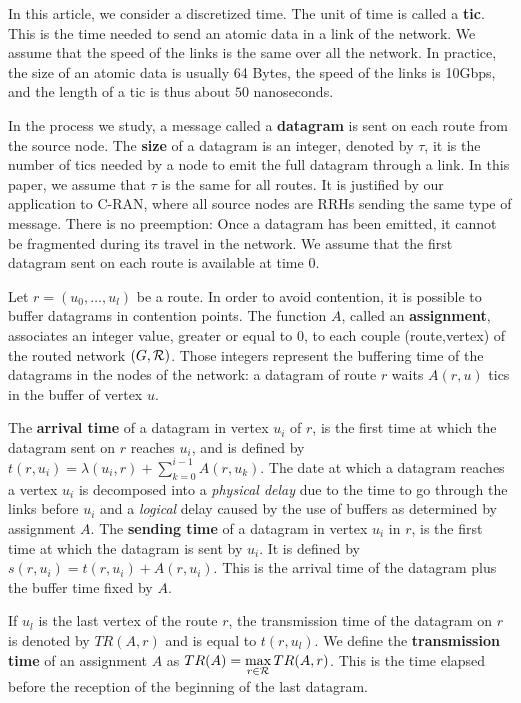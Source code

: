 \documentclass[english]{article}
\begin{document}
 		In this article, we consider a discretized time. The unit of time is called a {\bf tic}. This is the time needed to send an atomic data in a link of the network. We assume that the speed of the links is the same over all the network. In practice, the size of an atomic data is usually 64 Bytes, the speed of the links is 10Gbps, and the length of a tic is thus about $50$ nanoseconds.

        In the process we study, a message called a {\bf datagram} is sent on each route from the source node. The \textbf{size} of a datagram is an integer, denoted by $\tau$, it is the number of tics needed by a node to emit the full datagram through a link.  In this paper, we assume that $\tau$ is the same for all routes. It is justified by our application to C-RAN, where all source nodes are RRHs sending the same type of message. There is no preemption: Once a datagram has been emitted, it cannot be fragmented during its travel in the network. We assume that the first datagram sent on each route is available at time $0$.

          Let $r=(u_0,\dots,u_l)$ be a route. In order to avoid contention, it is possible to buffer datagrams in contention points. The function $A$, called an \textbf{assignment}, associates an integer value, greater or equal to $0$, to each couple (route,vertex) of the routed network $(G,{\cal R})$. Those integers represent the buffering time of the datagrams in the nodes of the network: a datagram of route $r$ waits $A(r,u)$ tics in the buffer of vertex $u$.
          
       

 The \textbf{arrival time} of a datagram in vertex $u_i$ of $r$, is the first time at which the datagram sent on $r$ reaches $u_i$, and is defined by $t(r,u_i) = \lambda(u_i,r) + \sum_{k=0}^{i-1} A(r,u_k) $. The date at which a datagram reaches a vertex $u_i$ is decomposed into a \emph{physical delay} due to the time to go through the links before $u_i$ and a \emph{logical} delay caused by the use of buffers as determined by assignment $A$.
  The \textbf{sending time} of a datagram in vertex $u_i$ in $r$, is the first time at which the datagram is sent by $u_i$. It is defined by $s(r,u_i) = t(r,u_i) +  A(r,u_i) $. This is the arrival time of the datagram plus the buffer time fixed by $A$.
 
  If $u_l$ is the last vertex of the route $r$, the transmission time of the datagram on 
  $r$ is denoted by $TR(A,r)$ and is equal to $t(r,u_l)$. We define the \textbf{transmission time} of an assignment $A$ as $TR(A) = \displaystyle \max\limits_{r \in {\cal R}} TR(A,r) $. This is the time elapsed before the reception of the beginning of the last datagram. 
         
\end{document}
